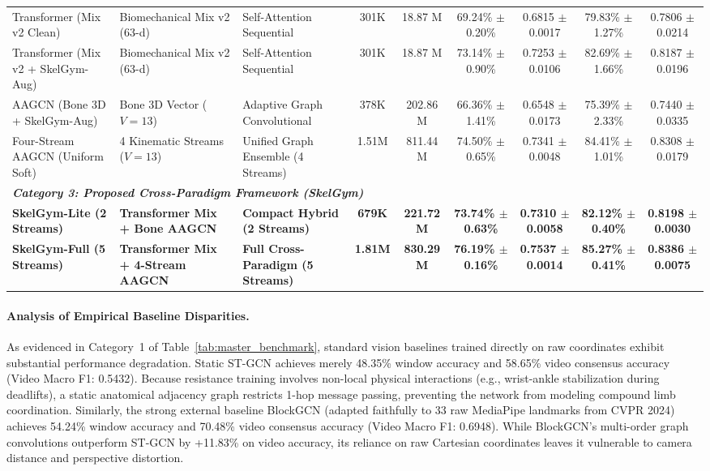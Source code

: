 \documentclass[preprint,12pt]{elsarticle}
\begin{document}
\begin{table}[!t]
{\begin{tabular}{l l l c c c c c c}
Transformer (Mix v2 Clean) & Biomechanical Mix v2 (63-d) & Self-Attention Sequential & 301K & 18.87 M & 69.24\% $\pm$ 0.20\% & 0.6815 $\pm$ 0.0017 & 79.83\% $\pm$ 1.27\% & 0.7806 $\pm$ 0.0214 \\
Transformer (Mix v2 + SkelGym-Aug) & Biomechanical Mix v2 (63-d) & Self-Attention Sequential & 301K & 18.87 M & 73.14\% $\pm$ 0.90\% & 0.7253 $\pm$ 0.0106 & 82.69\% $\pm$ 1.66\% & 0.8187 $\pm$ 0.0196 \\
AAGCN (Bone 3D + SkelGym-Aug) & Bone 3D Vector ($V=13$) & Adaptive Graph Convolutional & 378K & 202.86 M & 66.36\% $\pm$ 1.41\% & 0.6548 $\pm$ 0.0173 & 75.39\% $\pm$ 2.33\% & 0.7440 $\pm$ 0.0335 \\
Four-Stream AAGCN (Uniform Soft) & 4 Kinematic Streams ($V=13$) & Unified Graph Ensemble (4 Streams) & 1.51M & 811.44 M & 74.50\% $\pm$ 0.65\% & 0.7341 $\pm$ 0.0048 & 84.41\% $\pm$ 1.01\% & 0.8308 $\pm$ 0.0179 \\
\midrule
\multicolumn{9}{l}{\textit{\textbf{Category 3: Proposed Cross-Paradigm Framework (SkelGym)}}} \\
\textbf{SkelGym-Lite (2 Streams)} & \textbf{Transformer Mix + Bone AAGCN} & \textbf{Compact Hybrid (2 Streams)} & \textbf{679K} & \textbf{221.72 M} & \textbf{73.74\% $\pm$ 0.63\%} & \textbf{0.7310 $\pm$ 0.0058} & \textbf{82.12\% $\pm$ 0.40\%} & \textbf{0.8198 $\pm$ 0.0030} \\
\textbf{SkelGym-Full (5 Streams)} & \textbf{Transformer Mix + 4-Stream AAGCN} & \textbf{Full Cross-Paradigm (5 Streams)} & \textbf{1.81M} & \textbf{830.29 M} & \textbf{76.19\% $\pm$ 0.16\%} & \textbf{0.7537 $\pm$ 0.0014} & \textbf{85.27\% $\pm$ 0.41\%} & \textbf{0.8386 $\pm$ 0.0075} \\
\bottomrule
\end{tabular}
}
\end{table}

\paragraph{Analysis of Empirical Baseline Disparities.}
As evidenced in Category~1 of Table~\ref{tab:master_benchmark}, standard vision baselines trained directly on raw coordinates exhibit substantial performance degradation. Static ST-GCN \cite{yan2018} achieves merely 48.35\% window accuracy and 58.65\% video consensus accuracy (Video Macro F1: 0.5432). Because resistance training involves non-local physical interactions (e.g., wrist-ankle stabilization during deadlifts), a static anatomical adjacency graph restricts 1-hop message passing, preventing the network from modeling compound limb coordination. Similarly, the strong external baseline BlockGCN \cite{blockgcn2024} (adapted faithfully to 33 raw MediaPipe landmarks from CVPR 2024) achieves 54.24\% window accuracy and 70.48\% video consensus accuracy (Video Macro F1: 0.6948). While BlockGCN's multi-order graph convolutions outperform ST-GCN by +11.83\% on video accuracy, its reliance on raw Cartesian coordinates leaves it vulnerable to camera distance and perspective distortion.
\end{document}
